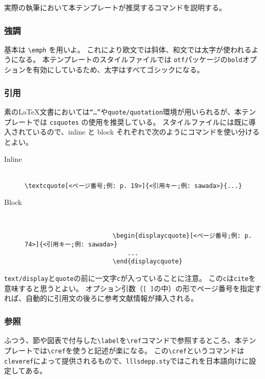 			実際の執筆において本テンプレートが推奨するコマンドを説明する。

			\subsubsection{強調}

				基本は \texttt{\textbackslash emph} を用いよ。
				これにより欧文では斜体、和文では太字が使われるようになる。
				本テンプレートのスタイルファイルでは \texttt{otf}パッケージの\texttt{bold}オプションを有効にしているため、太字はすべてゴシックになる。

			\subsubsection{引用}

				素の\LaTeX 文書においては\texttt{``\dots''}や\texttt{quote/quotation}環境が用いられるが、本テンプレートでは \texttt{csquotes} の使用を推奨している。
				スタイルファイルには既に導入されているので、inline と block それぞれで次のようにコマンドを使い分けるとよい。

				\begin{description}
					\item[Inline] 　\\
						\verb|\textcquote[<ページ番号;例: p. 19>]{<引用キー;例: sawada>}{...}|
					\item[Block] 　
					\begin{verbatim}
						\begin{displaycquote}[<ページ番号;例: p. 74>]{<引用キー;例: sawada>}
							...
						\end{displaycquote}
					\end{verbatim}
				\end{description}

				\noindent
				\texttt{text/display}と\texttt{quote}の前に一文字\texttt{c}が入っていることに注意。
				この\texttt{c}は\texttt{cite}を意味すると思うとよい。
				オプション引数（\texttt{[ ]}の中）の形でページ番号を指定すれば、自動的に引用文の後ろに参考文献情報が挿入される。

			\subsubsection{参照}

				ふつう、節や図表で付与した\verb|\label|を\verb|\ref|コマンドで参照するところ、本テンプレートでは\verb|\cref|を使うと記述が楽になる。
				この\verb|\cref|というコマンドは\texttt{cleveref}によって提供されるもので、\texttt{lllsdepp.sty}ではこれを日本語向けに設定してある。

